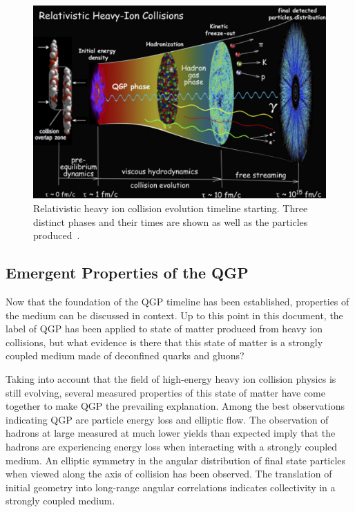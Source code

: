 \begin{figure}[!ht]
\begin{center}
\includegraphics[width=0.78\linewidth]{figs/qgp_evolution_timeline.png}
\caption{Relativistic heavy ion collision evolution timeline starting. Three distinct phases and their times are shown as well as the particles produced~\cite{Heinz:2013wva}.}
\end{center}
\label{fig:qgp_timeline}
\end{figure}

\subsection{Emergent Properties of the QGP}
Now that the foundation of the QGP timeline has been established, properties of the medium can be discussed in context. Up to this point in this document, the label of QGP has been applied to state of matter produced from heavy ion collisions, but what evidence is there that this state of matter is a strongly coupled medium made of deconfined quarks and gluons?

Taking into account that the field of high-energy heavy ion collision physics is still evolving, several measured properties of this state of matter have come together to make QGP the prevailing explanation. Among the best observations indicating QGP are particle energy loss and elliptic flow. The observation of hadrons at large \pt measured at much lower yields than expected imply that the hadrons are experiencing energy loss when interacting with a strongly coupled medium.  An elliptic symmetry in the angular distribution of final state particles when viewed along the axis of collision has been observed. The translation of initial geometry into long-range angular correlations indicates collectivity in a strongly coupled medium.


